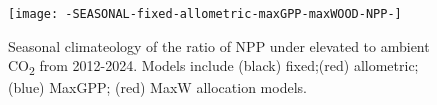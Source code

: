 \begin{figure}[h]
  \centering
    \texttt{[image: -SEASONAL-fixed-allometric-maxGPP-maxWOOD-NPP-]}
    \caption{Seasonal climateology of the ratio of NPP under elevated to ambient CO\textsubscript{2} from 2012-2024. Models include (black) fixed;(red) allometric; (blue) MaxGPP; (red) MaxW allocation models.}
\end{figure}